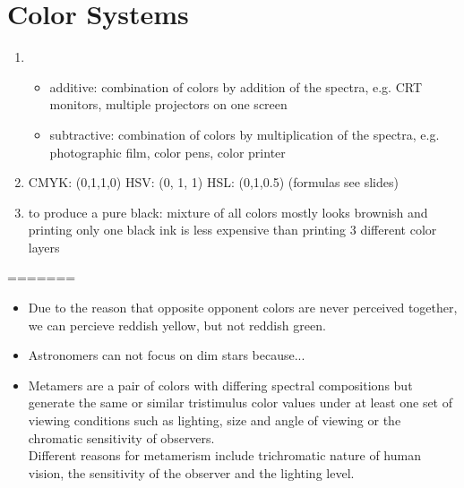 \documentclass{article}
\begin{document}
\section{Color Systems}
\begin{enumerate}
\item 
\begin{itemize}
\item additive:  combination of colors by addition of the spectra, e.g. CRT monitors, multiple projectors on one screen
\item subtractive: combination of colors by multiplication of the spectra, e.g. photographic film, color pens, color printer
\end{itemize}
\item CMYK: (0,1,1,0) HSV: (0, 1, 1) HSL: (0,1,0.5) (formulas see slides)
\item to produce a pure black: mixture of all colors mostly looks brownish and printing only one black ink is less expensive than printing 3 different color layers
\end{enumerate}
=======
\begin{itemize}
\item Due to the reason that opposite opponent colors are never perceived together, we can percieve reddish yellow, but not reddish green. 
\item Astronomers can not focus on dim stars because...

\item Metamers are a pair of colors with differing spectral compositions but generate the same or similar tristimulus color values under at least one set of viewing conditions such as lighting, size and angle of viewing or the chromatic sensitivity of observers. \\
Different reasons for metamerism include  trichromatic nature of human vision, the sensitivity of the observer and the lighting level.
\end{itemize}
\end{document}

